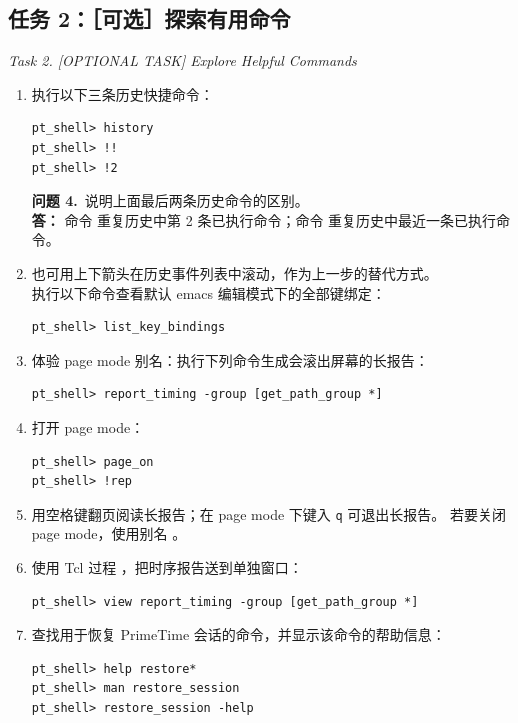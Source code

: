 \subsection{任务 2：［可选］探索有用命令}
\label{lab1:task2}

\noindent\textit{Task 2. [OPTIONAL TASK] Explore Helpful Commands}

\begin{enumerate}
  \item 执行以下三条历史快捷命令：
\begin{lstlisting}
pt_shell> history
pt_shell> !!
pt_shell> !2
\end{lstlisting}

\begin{questionBox}
\textbf{问题 4.}\ 说明上面最后两条历史命令的区别。\\[0.35em]
\textbf{答：} 命令  重复历史中第 2 条已执行命令；命令 \cmd{!!} 重复历史中最近一条已执行命令。
\end{questionBox}

  \item 也可用上下箭头在历史事件列表中滚动，作为上一步的替代方式。\\
        执行以下命令查看默认 emacs 编辑模式下的全部键绑定：
\begin{lstlisting}
pt_shell> list_key_bindings
\end{lstlisting}

  \item 体验 page mode 别名：执行下列命令生成会滚出屏幕的长报告：
\begin{lstlisting}
pt_shell> report_timing -group [get_path_group *]
\end{lstlisting}

  \item 打开 page mode：
\begin{lstlisting}
pt_shell> page_on
pt_shell> !rep
\end{lstlisting}

  \item 用空格键翻页阅读长报告；在 page mode 下键入 \texttt{q} 可退出长报告。
        若要关闭 page mode，使用别名 。

  \item 使用 Tcl 过程 ，把时序报告送到单独窗口：
\begin{lstlisting}
pt_shell> view report_timing -group [get_path_group *]
\end{lstlisting}

  \item 查找用于恢复 PrimeTime 会话的命令，并显示该命令的帮助信息：
\begin{lstlisting}
pt_shell> help restore*
pt_shell> man restore_session
pt_shell> restore_session -help
\end{lstlisting}


\end{enumerate}
